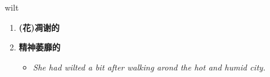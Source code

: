 
\begin{frame}
{\huge wilt}
\begin{center}
\begin{enumerate}\Large
  \item \textbf{(花)凋谢的}
  \item \textbf{精神萎靡的}
  \begin{itemize}
    \item \em{\Large{She had wilted a bit after walking arond the hot and humid city.}}
  \end{itemize}
\end{enumerate}
\end{center}
\end{frame}
